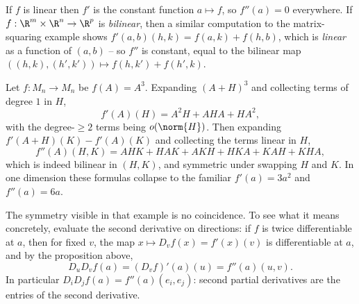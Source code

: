 \begin{example}
    If $f$ is linear then $f'$ is the constant function $a \mapsto f$, so $f''(a) = 0$ everywhere. If $f: \R^m \times \R^n \rightarrow \R^p$ is \emph{bilinear}, then a similar computation to the matrix-squaring example shows $f'(a, b)(h, k) = f(a, k) + f(h, b)$, which is \emph{linear} as a function of $(a, b)$ -- so $f''$ is constant, equal to the bilinear map $((h,k),(h',k')) \mapsto f(h, k') + f(h', k)$.
\end{example}

\begin{example}
    Let $f: M_n \rightarrow M_n$ be $f(A) = A^3$. Expanding $(A + H)^3$ and collecting terms of degree $1$ in $H$,
    $$
    f'(A)(H) = A^2H + AHA + HA^2,
    $$
    with the degree-$\geq 2$ terms being $o(\norm{H})$. Then expanding $f'(A + H)(K) - f'(A)(K)$ and collecting the terms linear in $H$,
    $$
    f''(A)(H, K) = AHK + HAK + AKH + HKA + KAH + KHA,
    $$
    which is indeed bilinear in $(H, K)$, and symmetric under swapping $H$ and $K$. In one dimension these formulas collapse to the familiar $f'(a) = 3a^2$ and $f''(a) = 6a$.
\end{example}

The symmetry visible in that example is no coincidence. To see what it means concretely, evaluate the second derivative on directions: if $f$ is twice differentiable at $a$, then for fixed $v$, the map $x \mapsto D_v f(x) = f'(x)(v)$ is differentiable at $a$, and by the proposition above,
$$
D_u D_v f(a) = (D_vf)'(a)(u) = f''(a)(u, v).
$$
In particular $D_iD_jf(a) = f''(a)(e_i, e_j)$: second partial derivatives are the entries of the second derivative.

